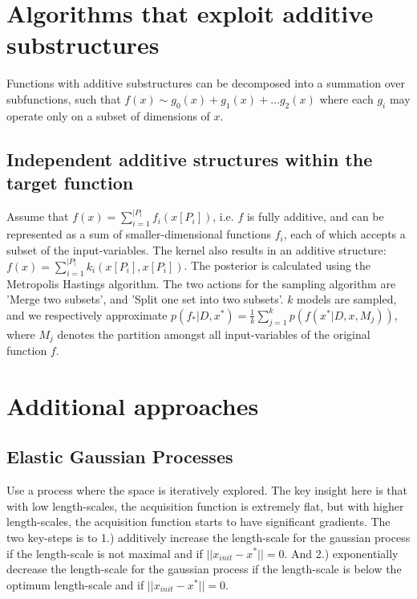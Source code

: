 \section{Algorithms that exploit additive substructures}

Functions with additive substructures can be decomposed into a summation over subfunctions, such that
$ f(x) \sim g_0(x) + g_1(x) + \ldots g_2(x) $ where each $g_i$ may operate only on a subset of dimensions of $x$.

\subsection{Independent additive structures within the target function}

\citep{Gardner2017} Assume that $f(x) = \sum_{i=1}^{ |P| } f_i (x[P_i] )$, i.e. $f$ is fully additive, and can be represented as a sum of smaller-dimensional functions $f_i$, each of which accepts a subset of the input-variables.
The kernel also results in an additive structure: $f(x) = \sum_{i=1}^{ |P| } k_i (x[P_i], x[P_i])$.
The posterior is calculated using the Metropolis Hastings algorithm.
The two actions for the sampling algorithm are 'Merge two subsets', and 'Split one set into two subsets'.
$k$ models are sampled, and we respectively approximate $p(f_* | D, x^*) = \frac{1}{k} \sum_{j=1}^{k} p( f(x^* | D, x, M_j) )$, where $M_j$ denotes the partition amongst all input-variables of the original function $f$.

\section{Additional approaches}

\subsection{Elastic Gaussian Processes}

\citep{Rana2017} Use a process where the space is iteratively explored.
The key insight here is that with low length-scales, the acquisition function is extremely flat, but with higher length-scales, the acquisition function starts to have significant gradients.
The two key-steps is to 1.) additively increase the length-scale for the gaussian process if the length-scale is not maximal and if $|| x_{init} - x^* || = 0$.
And 2.) exponentially decrease the length-scale for the gaussian process if the length-scale is below the optimum length-scale and if $|| x_{init} - x^* || = 0$.

